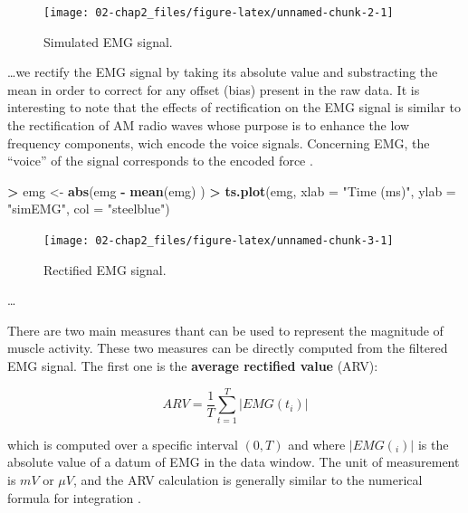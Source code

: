 \documentclass[12pt,]{book}
\newenvironment{Shaded}{\begin{snugshade}}{\end{snugshade}}
\newcommand{\KeywordTok}[1]{\textcolor[rgb]{0.13,0.29,0.53}{\textbf{#1}}}
\newcommand{\DataTypeTok}[1]{\textcolor[rgb]{0.13,0.29,0.53}{#1}}
\newcommand{\StringTok}[1]{\textcolor[rgb]{0.31,0.60,0.02}{#1}}
\newcommand{\OperatorTok}[1]{\textcolor[rgb]{0.81,0.36,0.00}{\textbf{#1}}}
\newcommand{\NormalTok}[1]{#1}
\begin{document}
\begin{figure}[h!]

{\centering \texttt{[image: 02-chap2\_files/figure-latex/unnamed-chunk-2-1]} 

}

\caption{Simulated EMG signal.}\label{fig:unnamed-chunk-2}
\end{figure}

\ldots{}we rectify the EMG signal by taking its absolute value and
substracting the mean in order to correct for any offset (bias) present
in the raw data. It is interesting to note that the effects of
rectification on the EMG signal is similar to the rectification of AM
radio waves whose purpose is to enhance the low frequency components,
wich encode the voice signals. Concerning EMG, the ``voice'' of the
signal corresponds to the encoded force \citep{Borg2007}.

\begin{Shaded}
\begin{Highlighting}[]
\OperatorTok{>}\StringTok{ }\NormalTok{emg <-}\StringTok{ }\KeywordTok{abs}\NormalTok{(emg }\OperatorTok{-}\StringTok{ }\KeywordTok{mean}\NormalTok{(emg) )}
\OperatorTok{>}\StringTok{ }\KeywordTok{ts.plot}\NormalTok{(emg, }\DataTypeTok{xlab =} \StringTok{"Time (ms)"}\NormalTok{, }\DataTypeTok{ylab =} \StringTok{"simEMG"}\NormalTok{, }\DataTypeTok{col =} \StringTok{"steelblue"}\NormalTok{)}
\end{Highlighting}
\end{Shaded}

\begin{figure}[h!]

{\centering \texttt{[image: 02-chap2\_files/figure-latex/unnamed-chunk-3-1]} 

}

\caption{Rectified EMG signal.}\label{fig:unnamed-chunk-3}
\end{figure}

\ldots{}

There are two main measures thant can be used to represent the magnitude
of muscle activity. These two measures can be directly computed from the
filtered EMG signal. The first one is the \textbf{average rectified
value} (ARV):

\[ARV = \frac{1}{T} \sum_{t=1}^{T} | EMG(t_{i}) |\]

which is computed over a specific interval \((0,T)\) and where
\(|EMG(_{i})|\) is the absolute value of a datum of EMG in the data
window. The unit of measurement is \(mV\) or \(\mu V\), and the ARV
calculation is generally similar to the numerical formula for
integration \citep{Kamen2010}.
\end{document}

